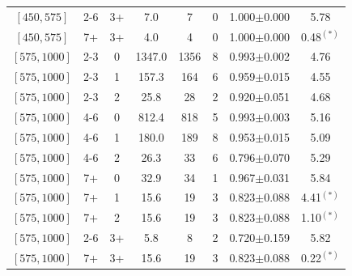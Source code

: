 \begin{table}
\begin{tabular}{c|c|c|c|c|c|c|c}
$[450,575]$ &2-6&3+&7.0&7&0&1.000$\pm$0.000&5.78\\
$[450,575]$ &7+&3+&4.0&4&0&1.000$\pm$0.000&0.48$^{(*)}$\\
$[575,1000]$ &2-3&0&1347.0&1356&8&0.993$\pm$0.002&4.76\\
$[575,1000]$ &2-3&1&157.3&164&6&0.959$\pm$0.015&4.55\\
$[575,1000]$ &2-3&2&25.8&28&2&0.920$\pm$0.051&4.68\\
$[575,1000]$ &4-6&0&812.4&818&5&0.993$\pm$0.003&5.16\\
$[575,1000]$ &4-6&1&180.0&189&8&0.953$\pm$0.015&5.09\\
$[575,1000]$ &4-6&2&26.3&33&6&0.796$\pm$0.070&5.29\\
$[575,1000]$ &7+&0&32.9&34&1&0.967$\pm$0.031&5.84\\
$[575,1000]$ &7+&1&15.6&19&3&0.823$\pm$0.088&4.41$^{(*)}$\\
$[575,1000]$ &7+&2&15.6&19&3&0.823$\pm$0.088&1.10$^{(*)}$\\
$[575,1000]$ &2-6&3+&5.8&8&2&0.720$\pm$0.159&5.82\\
$[575,1000]$ &7+&3+&15.6&19&3&0.823$\pm$0.088&0.22$^{(*)}$\\
\hline \hline
	\end{tabular}
	\label{tbl:zinvCRs1}
\end{table}

